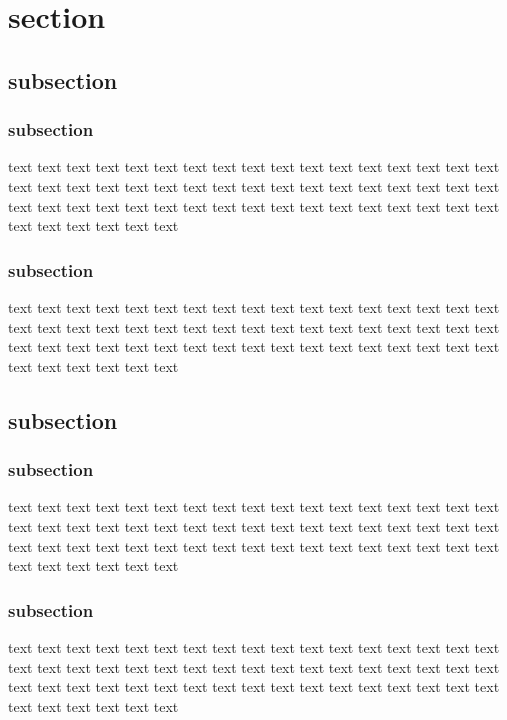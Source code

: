 \documentclass[12pt,a4paper,twoside]{article}
\begin{document}
	\section{section}
		\subsection{subsection}
			\subsubsection{subsection}
					text text text text text text text text text text text text text text text text text text text text text text text text text text text text text text text text text text text text text text text text text text text text text text text text text text text text text text text text text
			\subsubsection{subsection}
					text text text text text text text text text text text text text text text text text text text text text text text text text text text text text text text text text text text text text text text text text text text text text text text text text text text text text text text text text
		\subsection{subsection}
			\subsubsection{subsection}
					text text text text text text text text text text text text text text text text text text text text text text text text text text text text text text text text text text text text text text text text text text text text text text text text text text text text text text text text text
			\subsubsection{subsection}
					text text text text text text text text text text text text text text text text text text text text text text text text text text text text text text text text text text text text text text text text text text text text text text text text text text text text text text text text text
\end{document}
